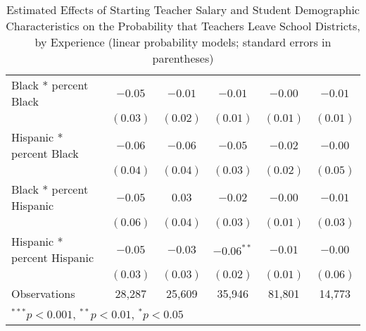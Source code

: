 \documentclass[]{article}
\begin{document}
\begin{table}
\begin{center}
\begin{tabular}{l c c c c c }
\quad Black * percent Black                 & $-0.05$     & $-0.01$      & $-0.01$      & $-0.00$      & $-0.01$     \\
                                            & $(0.03)$    & $(0.02)$     & $(0.01)$     & $(0.01)$     & $(0.01)$    \\
\quad Hispanic * percent Black              & $-0.06$     & $-0.06$      & $-0.05$      & $-0.02$      & $-0.00$     \\
                                            & $(0.04)$    & $(0.04)$     & $(0.03)$     & $(0.02)$     & $(0.05)$    \\
\quad Black * percent Hispanic              & $-0.05$     & $0.03$       & $-0.02$      & $-0.00$      & $-0.01$     \\
                                            & $(0.06)$    & $(0.04)$     & $(0.03)$     & $(0.01)$     & $(0.03)$    \\
\quad Hispanic * percent Hispanic           & $-0.05$     & $-0.03$      & $-0.06^{**}$ & $-0.01$      & $-0.00$     \\
                                            & $(0.03)$    & $(0.03)$     & $(0.02)$     & $(0.01)$     & $(0.06)$    \\
\hline
Observations                                & 28,287       & 25,609        & 35,946        & 81,801        & 14,773       \\
\hline
\multicolumn{6}{l}{\scriptsize{$^{***}p<0.001$, $^{**}p<0.01$, $^*p<0.05$}}
\end{tabular}
\caption{Estimated Effects of Starting Teacher Salary and Student Demographic Characteristics on the Probability that Teachers Leave School Districts, by Experience (linear probability models; standard errors in parentheses)}
\label{tbl:reg_lpm}
\end{center}
\end{table}
\end{document}
